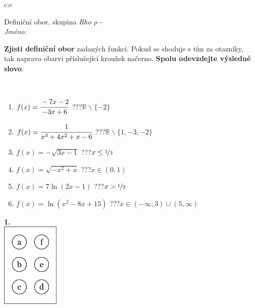 \documentclass[10pt]{report}
\begin{document}
\begin{tabular}{c:c}
\begin{minipage}[c][104.5mm][t]{0.5\linewidth}
\begin{center}
\vspace{7mm}
{\huge Definiční obor, skupina \textit{Rho $\rho$} -}\\[5mm]
\textit{Jméno:}\phantom{xxxxxxxxxxxxxxxxxxxxxxxxxxxxxxxxxxxxxxxxxxxxxxxxxxxxxxxxxxxxxxxxx}\\[5mm]
\begin{minipage}{0.95\linewidth}
\begin{center}
\textbf{Zjisti definiční obor} zadaných funkcí. Pokud se shoduje s tím za otazníky,\\tak napravo obarvi příslušející kroužek načerno. \textbf{Spolu odevzdejte výsledné slovo}.
\end{center}
\end{minipage}
\\[1mm]
\begin{minipage}{0.79\linewidth}
\begin{center}
\begin{varwidth}{\linewidth}
\begin{enumerate}
\normalsizerrr
\item $f(x)=\cfrac{-7x-2}{-3x+6}$\quad \dotfill\; ???\;\dotfill \quad $\mathbb{R}\smallsetminus\{-2\}$
\item $f(x)=\cfrac{1}{x^3+4x^2+x-6}$\quad \dotfill\; ???\;\dotfill \quad $\mathbb{R}\smallsetminus\{1,-3,-2\}$
\item $f(x)=-\sqrt{3x-1}$\quad \dotfill\; ???\;\dotfill \quad $x\leq\nicefrac{1}{3}$
\item $f(x)=\sqrt{-x^2+x}$\quad \dotfill\; ???\;\dotfill \quad $x\in(0 , 1)$
\item $f(x)=7\ln{(2x-1)}$\quad \dotfill\; ???\;\dotfill \quad $x>\nicefrac{1}{2}$
\item $f(x)=\ln{(x^2-8x+15)}$\quad \dotfill\; ???\;\dotfill \quad $x\in(-\infty , 3)\cup(5 , \infty)$
\end{enumerate}
\end{varwidth}
\end{center}
\end{minipage}
\begin{minipage}{0.20\linewidth}
\begin{center}
{\Huge\bfseries 1.} \\[2mm]
\includegraphics[height=40mm]{../images/braille.png}

\end{center}
\end{minipage}
\end{center}
\end{minipage}
\end{tabular}
\end{document}
